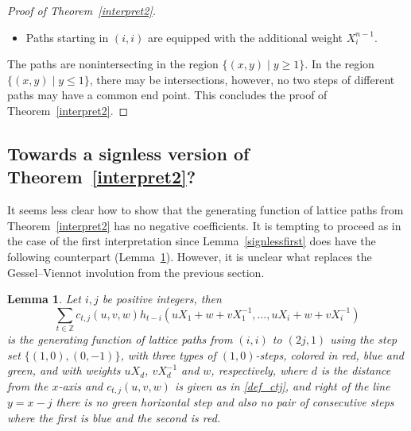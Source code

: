 \documentclass[12pt]{amsart}
\newtheorem{lemma}[theorem]{Lemma}
\theoremstyle{definition}
\numberwithin{equation}{section}
\begin{document}
\begin{proof}[Proof of Theorem~\ref{interpret2}]
\begin{itemize}
		$(t,1)$ to $(2,-j+2)$, then the generating function of such paths is $c_{t,j}(u,v,w)$.
		\item Paths starting in $(i,i)$ are equipped with the additional weight $X_i^{n-1}$. 
	\end{itemize} 
	The paths are nonintersecting in the region $\{(x,y) \mid y \ge 1\}$. In the region $\{(x,y) \mid y \le 1\}$, there may be intersections, however, no two steps of different paths may have a common end point. This concludes the proof of Theorem~\ref{interpret2}. 
\end{proof}

\subsection*{Towards a signless version of Theorem~\ref{interpret2}?} 

It seems less clear how to show that the generating function of lattice paths from 
Theorem~\ref{interpret2} has no negative coefficients. It is tempting to proceed as in the case of the first interpretation since Lemma~\ref{signlessfirst} does have the following counterpart (Lemma~\ref{counterpart}). However, it 
is unclear what replaces the Gessel--Viennot involution from the previous section.

\begin{lemma} 
	\label{counterpart} 
	Let $i,j$ be positive integers, then 
	\begin{equation*}
	\sum_{t\in\mathbb{Z}} 
	c_{t,j}(u,v,w) 
	h_{t-i}(u X_1 + w + v X_1^{-1},\ldots,u X_i + w + v X_i^{-1})
	\end{equation*}
	is the generating function of lattice paths from $(i,i)$ to $(2j,1)$ using the step set $\{(1,0),\allowbreak (0,-1)\}$, with three types of $(1,0)$-steps, colored in red, blue and green, and with weights $u X_d$, $v X_d^{-1}$ and $w$, respectively, where $d$ is the distance from the $x$-axis and $c_{t,j}(u,v,w)$ is given as in \eqref{def_ctj}, and right of the line $y=x-j$ there is no green horizontal step and also no pair of consecutive 
	steps where the first is blue and the second is red.
\end{lemma} 
\end{document}
